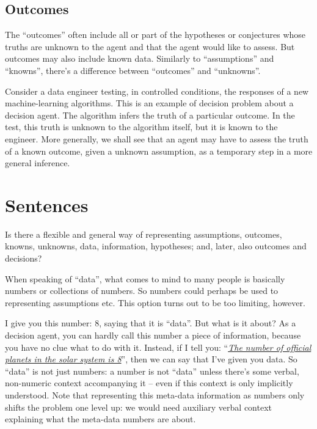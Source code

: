 \documentclass[
  a4paper,
  DIV=11,
  numbers=noendperiod,
  oneside]{scrreprt}
\begin{document}
\hypertarget{outcomes}{%
\subsection{Outcomes}\label{outcomes}}

The ``outcomes'' often include all or part of the hypotheses or
conjectures whose truths are unknown to the agent and that the agent
would like to assess. But outcomes may also include known data.
Similarly to ``assumptions'' and ``knowns'', there's a difference
between ``outcomes'' and ``unknowns''.

Consider a data engineer testing, in controlled conditions, the
responses of a new machine-learning algorithms. This is an example of
decision problem about a decision agent. The algorithm infers the truth
of a particular outcome. In the test, this truth is unknown to the
algorithm itself, but it is known to the engineer. More generally, we
shall see that an agent may have to assess the truth of a known outcome,
given a unknown assumption, as a temporary step in a more general
inference.

\hypertarget{sentences}{%
\section{Sentences}\label{sentences}}

Is there a flexible and general way of representing assumptions,
outcomes, knowns, unknowns, data, information, hypotheses; and, later,
also outcomes and decisions?

When speaking of ``data'', what comes to mind to many people is
basically numbers or collections of numbers. So numbers could perhaps be
used to representing assumptions etc. This option turns out to be too
limiting, however.

I give you this number: \(8\), saying that it is ``data''. But what is
it about? As a decision agent, you can hardly call this number a piece
of information, because you have no clue what to do with it. Instead, if
I tell you:
``\emph{\href{https://solarsystem.nasa.gov/planets/overview}{The number
of official planets in the solar system is 8}}'', then we can say that
I've given you data. So ``data'' is not just numbers: a number is not
``data'' unless there's some verbal, non-numeric context accompanying it
-- even if this context is only implicitly understood. Note that
representing this meta-data information as numbers only shifts the
problem one level up: we would need auxiliary verbal context explaining
what the meta-data numbers are about.
\end{document}
